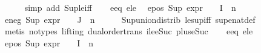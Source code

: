 \begin{isabellebody}
\ \ \ \ \isamarkupfalse%
\ {\isacharparenleft}{\kern0pt}simp\ add{\isacharcolon}{\kern0pt}\ Sup{\isacharunderscore}{\kern0pt}le{\isacharunderscore}{\kern0pt}iff{\isacharparenright}{\kern0pt}{\isacharplus}{\kern0pt}\isanewline
\isanewline
\ \ \isamarkupfalse%
\ e{}{\isacharunderscore}{\kern0pt}eq\ e{}{\isacharunderscore}{\kern0pt}le\ \isamarkupfalse%
\ e{}{\isacharunderscore}{\kern0pt}pos{\isacharcolon}{\kern0pt}\ {\isachardoublequoteopen}Sup\ {\isacharparenleft}{\kern0pt}{\isacharparenleft}{\kern0pt}expr{\isacharunderscore}{\kern0pt}{}\ {\isasymcirc}\ {\isasymPhi}{\isacharparenright}{\kern0pt}\ {\isacharbackquote}{\kern0pt}\ I{\isacharparenright}{\kern0pt}\ {\isacharless}{\kern0pt}{\isacharequal}{\kern0pt}\ n{}{\isachardoublequoteclose}\isanewline
{}\ e{}{\isacharunderscore}{\kern0pt}neg{\isacharcolon}{\kern0pt}\ {\isachardoublequoteopen}Sup\ {\isacharparenleft}{\kern0pt}{\isacharparenleft}{\kern0pt}expr{\isacharunderscore}{\kern0pt}{}\ {\isasymcirc}\ {\isasymPhi}{\isacharparenright}{\kern0pt}\ {\isacharbackquote}{\kern0pt}\ J{\isacharparenright}{\kern0pt}\ {\isasymle}\ n{}{\isachardoublequoteclose}\isanewline
\ \ \ \ \isamarkupfalse%
\ Sup{\isacharunderscore}{\kern0pt}union{\isacharunderscore}{\kern0pt}distrib\ le{\isacharunderscore}{\kern0pt}sup{\isacharunderscore}{\kern0pt}iff\ sup{\isacharunderscore}{\kern0pt}enat{\isacharunderscore}{\kern0pt}def\isanewline
\ \ \ \ \isamarkupfalse%
\ {\isacharparenleft}{\kern0pt}metis\ {\isacharparenleft}{\kern0pt}no{\isacharunderscore}{\kern0pt}types{\isacharcomma}{\kern0pt}\ lifting{\isacharparenright}{\kern0pt}\ dual{\isacharunderscore}{\kern0pt}order{\isachardot}{\kern0pt}trans\ ile{\isacharunderscore}{\kern0pt}eSuc\ plus{\isacharunderscore}{\kern0pt}{}{\isacharunderscore}{\kern0pt}eSuc{\isacharparenleft}{\kern0pt}{}{\isacharparenright}{\kern0pt}{\isacharparenright}{\kern0pt}{\isacharplus}{\kern0pt}\isanewline
\isanewline
\ \ \isamarkupfalse%
\ e{}{\isacharunderscore}{\kern0pt}eq\ e{}{\isacharunderscore}{\kern0pt}le\ \isamarkupfalse%
\ e{}{\isacharunderscore}{\kern0pt}pos{\isacharcolon}{\kern0pt}\ {\isachardoublequoteopen}Sup\ {\isacharparenleft}{\kern0pt}{\isacharparenleft}{\kern0pt}expr{\isacharunderscore}{\kern0pt}{}\ {\isasymcirc}\ {\isasymPhi}{\isacharparenright}{\kern0pt}\ {\isacharbackquote}{\kern0pt}\ I{\isacharparenright}{\kern0pt}\ {\isacharless}{\kern0pt}{\isacharequal}{\kern0pt}\ n{}{\isachardoublequoteclose}\isanewline

\end{isabellebody}
